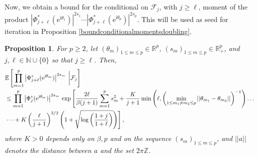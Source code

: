 \documentclass[]{article}
\newtheorem{prop}[thm]{Proposition}
\begin{document}
Now, we obtain a bound for the conditional on $\mathcal{F}_j$, with $j\ge \ell$, moment of the product $|\Phi_{j+\ell}^*(\mathrm{e}^{\mathrm{i}\theta_1})|^{2s_1}\cdots |\Phi_{j+\ell}^*(\mathrm{e}^{\mathrm{i}\theta_p})|^{2s_p}$. This will be used as seed for iteration in Proposition \ref{boundconditionalmomentsdoubling}.
\begin{prop} \label{boundconditionalmoment}
For $p \geq 2$, let $(\theta_m)_{1 \leq m \leq p}\in \mathbb{R}^p$, $(s_m)_{1 \leq m \leq p}\in\mathbb{R}_+^p$, 
and $j,\ell \in \mathbb{N}\cup \{0\}$ so that $j \geq \ell$.  
Then, 
\begin{align*}
& \mathbb{E} \left[ \prod_{m=1}^p \left|\Phi^*_{j+\ell} (\mathrm{e}^{\textnormal{i} \theta_m})
\right|^{2s_m} \;  \bigg| \mathcal{F}_j \right]
\\ & \leq \prod_{m=1}^p \left|\Phi^*_{j} (\mathrm{e}^{\textnormal{i} \theta_m})
\right|^{2s_m} \, \exp \left[ 
\frac{2 \ell}{\beta (j+1)}  
 \sum_{m=1}^{p} s_m^2 
+ \frac{K}{j+1} \min \left( \ell, \left(\min_{1 \leq m_1 \neq m_2 \leq p} 
||\theta_{m_1} - \theta_{m_2}|| \right)^{-1} \right)  \dots \right.
\\ & \left.  \dots
+ K \left(\frac{\ell}{j+1} \right)^{3/2}    \left(1 + \sqrt{\log \left(\frac{1+j}{1 + \ell} \right) } \right)   
\right],
\end{align*}
where $K > 0$ depends only on $\beta, p$
and on the sequence $(s_m)_{1 \leq m \leq p}$, and $||a||$ denotes the distance between $a$ and the set $2 \pi \mathbb{Z}$. 
\end{prop}
\end{document}

